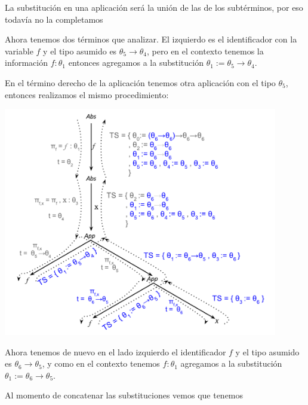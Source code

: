 \documentclass[a4paper,10pt]{article}
\begin{document}
  La substitución en una aplicación será la unión de las de los subtérminos, por eso todavía no la completamos
  \medskip

  Ahora tenemos dos términos que analizar. El izquierdo es el identificador con la variable $f$ y el tipo asumido es
  $\theta_5 \rightarrow \theta_4$, pero en el contexto tenemos la información $f:\theta_1$ entonces agregamos
  a la substitución $\theta_1 := \theta_5 \rightarrow \theta_4$. 
  
  En el término derecho de la aplicación tenemos otra aplicación con el tipo $\theta_5$, entonces realizamos el mismo
  procedimiento:
  
\begin{center}
\includegraphics[height=10cm]{./cuarto.pdf}
\end{center}
   
  Ahora tenemos de nuevo en el lado izquierdo el identificador $f$ y el tipo asumido es $\theta_6 \rightarrow \theta_5$,
  y como en el contexto tenemos $f:\theta_1$ agregamos a la substitución $\theta_1 := \theta_6 \rightarrow \theta_5$.
  
  Al momento de concatenar las substituciones vemos que tenemos 
  
  
  
  
   
\end{document}

